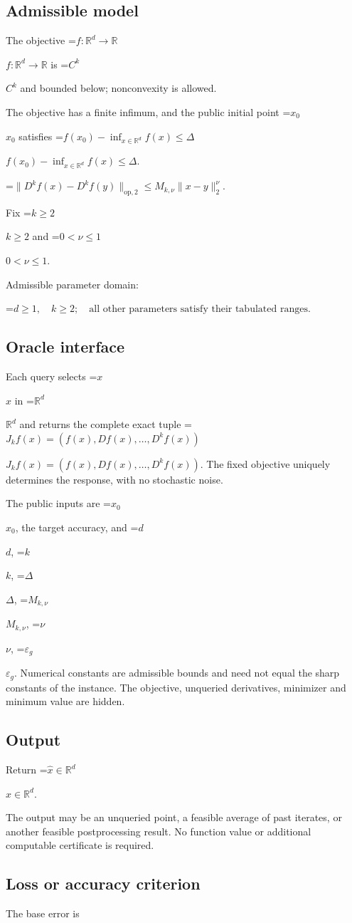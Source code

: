 \documentclass[10pt,a4paper]{article}
\newcommand{\AtlasMath}[1]{\par\begingroup\centering\setbox0=\hbox{$\displaystyle #1$}\ifdim\wd0>1.4\linewidth\typeout{ATLAS WIDE FORMULA: \the\wd0}\fi\ifdim\wd0>\linewidth\resizebox{\linewidth}{!}{\box0}\else\box0\fi\par\endgroup}
\newcommand{\AtlasInlineMath}[1]{\begingroup\setbox0=\hbox{$#1$}\ifdim\wd0>.4\linewidth\endgroup\AtlasMath{#1}\else\endgroup$#1$\fi}
\begin{document}
\subsection{Admissible model}
The objective \AtlasInlineMath{f:\mathbb{R}^d\to\mathbb{R}} is \AtlasInlineMath{C^k} and bounded below; nonconvexity is allowed.

The objective has a finite infimum, and the public initial point \AtlasInlineMath{x_0} satisfies \AtlasInlineMath{f(x_0)-\inf_{x\in \mathbb{R}^d}f(x)\le\Delta}.


\AtlasMath{\|D^{k}f(x)-D^{k}f(y)\|_{\mathrm{op},2}\le M_{k,\nu}\|x-y\|_{2}^{\nu}.}


Fix \AtlasInlineMath{k\ge2} and \AtlasInlineMath{0<\nu\le1}.

Admissible parameter domain:


\AtlasMath{d\ge1,\quad k\ge2;\quad\text{all other parameters satisfy their tabulated ranges}.}


\subsection{Oracle interface}
Each query selects \AtlasInlineMath{x} in \AtlasInlineMath{\mathbb{R}^d} and returns the complete exact tuple \AtlasInlineMath{J_{k}f(x)=(f(x),Df(x),\ldots,D^{k}f(x))}. The fixed objective uniquely determines the response, with no stochastic noise.

The public inputs are \AtlasInlineMath{x_0}, the target accuracy, and \AtlasInlineMath{d}, \AtlasInlineMath{k}, \AtlasInlineMath{\Delta}, \AtlasInlineMath{M_{k,\nu}}, \AtlasInlineMath{\nu}, \AtlasInlineMath{\varepsilon_g}. Numerical constants are admissible bounds and need not equal the sharp constants of the instance. The objective, unqueried derivatives, minimizer and minimum value are hidden.

\subsection{Output}
Return \AtlasInlineMath{\widehat{x}\in \mathbb{R}^d}.

The output may be an unqueried point, a feasible average of past iterates, or another feasible postprocessing result. No function value or additional computable certificate is required.

\subsection{Loss or accuracy criterion}
The base error is
\end{document}
